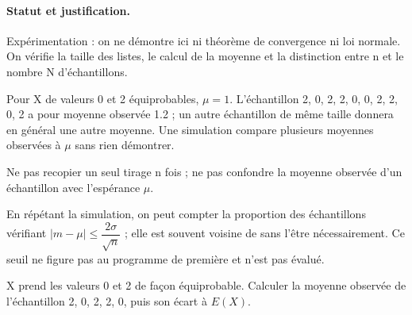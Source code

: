 \paragraph{Statut et justification.} Expérimentation : on ne démontre ici ni théorème de convergence ni loi normale. On vérifie la taille des listes, le calcul de la moyenne et la distinction entre n et le nombre N d’échantillons.
\begin{example}Pour X de valeurs 0 et 2 équiprobables, $\mu=1$. L’échantillon 2, 0, 2, 2, 0, 0, 2, 2, 0, 2 a pour moyenne observée \num{1,2} ; un autre échantillon de même taille donnera en général une autre moyenne. Une simulation compare plusieurs moyennes observées à $\mu$ sans rien démontrer.\end{example}\label{C08-EX5}
\begin{pitfall}Ne pas recopier un seul tirage n fois ; ne pas confondre la moyenne observée d’un échantillon avec l’espérance $\mu$.\end{pitfall}
\begin{beyond}En répétant la simulation, on peut compter la proportion des échantillons vérifiant $|m-\mu|\leq \dfrac{2\sigma}{\sqrt n}$ ; elle est souvent voisine de  sans l’être nécessairement. Ce seuil ne figure pas au programme de première et n’est pas évalué.\end{beyond}
\begin{application}X prend les valeurs 0 et 2 de façon équiprobable. Calculer la moyenne observée de l’échantillon 2, 0, 2, 2, 0, puis son écart à $E(X)$.\end{application}\label{C08-AP5}
\mxnewpage
